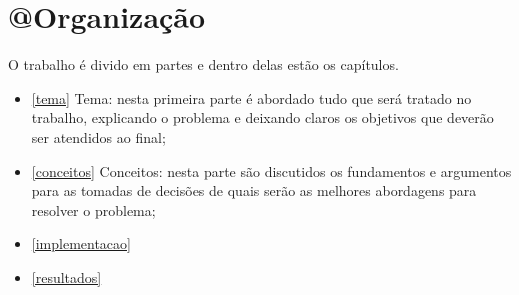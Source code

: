 \chapter{@Organização}

O trabalho é divido em partes e dentro delas estão
os capítulos.

\begin{itemize}
    \item \autoref{tema} Tema: nesta primeira parte é abordado tudo que será tratado
          no trabalho, explicando o problema e deixando claros os objetivos que
          deverão ser atendidos ao final;

    \item \autoref{conceitos} Conceitos: nesta parte são discutidos os fundamentos e
          argumentos para as tomadas de decisões de quais serão as melhores
          abordagens para resolver o problema;

    \item \autoref{implementacao}

    \item \autoref{resultados}

\end{itemize}
